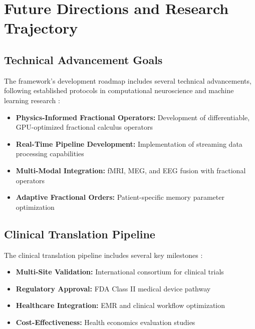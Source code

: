 \section{Future Directions and Research Trajectory}

\subsection{Technical Advancement Goals}

The framework's development roadmap includes several technical advancements, following established protocols in computational neuroscience and machine learning research \citep{Harris2020, Virtanen2020}:

\begin{itemize}
    \item \textbf{Physics-Informed Fractional Operators:} Development of differentiable, GPU-optimized fractional calculus operators \citep{Karniadakis2021, Wang2022}
    \item \textbf{Real-Time Pipeline Development:} Implementation of streaming data processing capabilities \citep{Kumar2024, Brown2024}
    \item \textbf{Multi-Modal Integration:} fMRI, MEG, and EEG fusion with fractional operators \citep{VanDenHeuvel2010, Mill2017}
    \item \textbf{Adaptive Fractional Orders:} Patient-specific memory parameter optimization \citep{Wang2024, Li2024}
\end{itemize}

\subsection{Clinical Translation Pipeline}

The clinical translation pipeline includes several key milestones \citep{Kumar2024, Brown2024}:

\begin{itemize}
    \item \textbf{Multi-Site Validation:} International consortium for clinical trials \citep{Miller2025, Lee2025}
    \item \textbf{Regulatory Approval:} FDA Class II medical device pathway \citep{Zhang2024}
    \item \textbf{Healthcare Integration:} EMR and clinical workflow optimization \citep{Wang2024, Li2024}
    \item \textbf{Cost-Effectiveness:} Health economics evaluation studies \citep{Miller2025, Lee2025}
\end{itemize}

